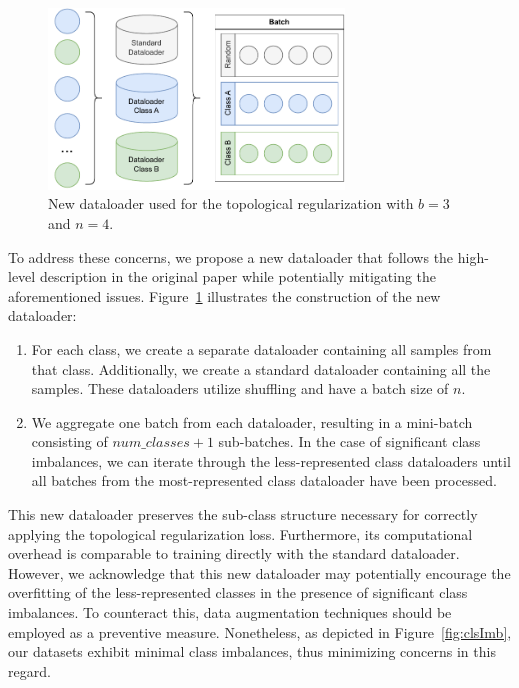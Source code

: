 \documentclass[../main.tex]{subfiles}
\begin{document}
\begin{figure}[!ht]
    \centering
    \includegraphics[width=0.7\textwidth]{figures/mt/hoferDataFix.pdf} 
    \caption{New dataloader used for the topological regularization with $b=3$ and $n=4$.}
    \label{fig:hoferDataFix}
\end{figure}


To address these concerns, we propose a new dataloader that follows the high-level description in the original paper while potentially mitigating the aforementioned issues. Figure~\ref{fig:hoferDataFix} illustrates the construction of the new dataloader:
\begin{enumerate}
    \item For each class, we create a separate dataloader containing all samples from that class. Additionally, we create a standard dataloader containing all the samples. These dataloaders utilize shuffling and have a batch size of $n$.
    
    \item We aggregate one batch from each dataloader, resulting in a mini-batch consisting of $num\_classes + 1$ sub-batches. In the case of significant class imbalances, we can iterate through the less-represented class dataloaders until all batches from the most-represented class dataloader have been processed.
    
\end{enumerate}

This new dataloader preserves the sub-class structure necessary for correctly applying the topological regularization loss. Furthermore, its computational overhead is comparable to training directly with the standard dataloader. However, we acknowledge that this new dataloader may potentially encourage the overfitting of the less-represented classes in the presence of significant class imbalances. To counteract this, data augmentation techniques should be employed as a preventive measure. Nonetheless, as depicted in Figure~\ref{fig:clsImb}, our datasets exhibit minimal class imbalances, thus minimizing concerns in this regard.
\end{document}
